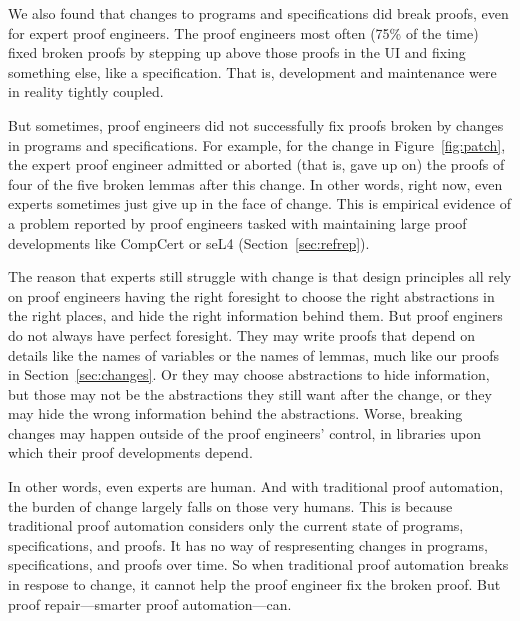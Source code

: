 We also found that changes to programs and specifications did break proofs, even for expert proof engineers.
The proof engineers most often (75\% of the time) fixed broken proofs by stepping 
up above those proofs in the UI and fixing something else, like a specification.
That is, development and maintenance were in reality tightly coupled.

But sometimes, proof engineers did not successfully fix proofs broken by changes in programs and specifications.
For example, for the change in Figure~\ref{fig:patch},
the expert proof engineer admitted or aborted (that is, gave up on) the proofs of four of the five
broken lemmas after this change.
In other words, right now, even experts sometimes just give up in the face of change.
This is empirical evidence of a problem reported by proof engineers
tasked with maintaining large proof developments
like CompCert or seL4 (Section~\ref{sec:refrep}).

The reason that experts still struggle with change is that
design principles all rely on proof engineers having the right foresight to choose the 
right abstractions in the right places, and hide the right information behind them.
But proof enginers do not always have perfect foresight.
They may write proofs that depend on details like the names of variables or the names of lemmas,
much like our proofs in Section~\ref{sec:changes}.
Or they may choose abstractions to hide information, but those may not be the abstractions they still want after the change,
or they may hide the wrong information behind the abstractions.
Worse, breaking changes may happen outside of the proof engineers' control,
in libraries upon which their proof developments depend.

In other words, even experts are human.
And with traditional proof automation, the burden of change largely falls on those very humans.
This is because traditional proof automation considers only the current state of programs, specifications, and proofs.
It has no way of respresenting changes in programs, specifications, and proofs over time.
So when traditional proof automation breaks in respose to change, it cannot help the proof engineer fix the broken proof.
But proof repair---smarter proof automation---can.


%

%

